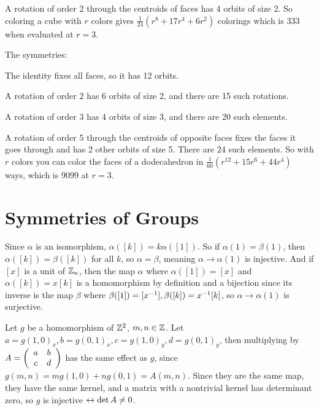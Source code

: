 \documentclass[11pt, oneside]{article}   	%
\begin{document}
\item A rotation of order 2 through the centroids of faces has 4 orbits of size 2.
\ee
So coloring a cube with $r$ colors gives $\frac{1}{24} (r^8 + 17r^4 + 6r^2)$ colorings which is 333 when evaluated at $r=3$.
\item The symmetries:
\be
\item The identity fixes all faces, so it has 12 orbits.
\item A rotation of order 2 has 6 orbits of size 2, and there are 15 such rotations.
\item A rotation of order 3 has 4 orbits of size 3, and there are 20 such elements.
\item A rotation of order 5 through the centroids of opposite faces fixes the faces it goes through and has 2 other orbits of size 5. There are 24 such elements.
\ee
So with $r$ colors you can color the faces of a dodecahedron in $\frac{1}{60}(r^{12} + 15r^6 + 44r^4)$ ways, which is 9099 at $r=3$.
\ee
\section{Symmetries of Groups}
\be
\item Since $\alpha$ is an isomorphism, $\alpha([k]) = k\alpha([1])$. So if $\alpha(1) = \beta(1)$, then $\alpha([k]) = \beta([k])$ for all $k$, so $\alpha = \beta$, meaning $\alpha \to \alpha(1)$ is injective. And if $[x]$ is a unit of $\mathbb{Z}_n$, then the map $\alpha$ where $\alpha([1]) = [x]$ and $\alpha([k]) = x[k]$ is a homomorphism by definition and a bijection since its inverse is the map $\beta$ where $\beta([1]) = [x^{-1}], \beta([k]) = x^{-1} [k]$, so $\alpha \to \alpha(1)$ is surjective.
\item Let $g$ be a homomorphism of $\mathbb{Z}^2$, $m, n \in \mathbb{Z}$. Let $a = g(1, 0)_x, b = g(0, 1)_x, c = g(1, 0)_y, d = g(0, 1)_y$, then multiplying by $A =\left( \begin{array}{ccc} a & b \\ c & d \end{array} \right)$ has the same effect as $g$, since $g(m, n) = mg(1, 0) + ng(0, 1) = A(m, n)$. Since they are the same map, they have the same kernel, and a matrix with a nontrivial kernel has determinant zero, so $g$ is injective $\leftrightarrow \det A \not = 0$.
\end{document}
